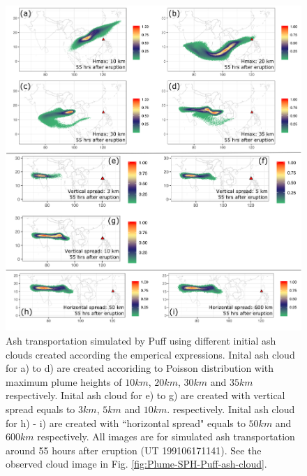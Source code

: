 \documentclass[utf8]{frontiersSCNS} %
\begin{document}
\begin{figure}[!htb]
\centering
\includegraphics[width=0.99 \textwidth]{Figures/discussion}
\caption{Ash transportation simulated by Puff using different initial ash clouds created according the emperical expressions. Inital ash cloud for a) to d)  are created accoriding to Poisson distribution with maximum plume heights of $10km $, $20km$, $30km$ and $35km$ respectively.  Inital ash cloud for e) to g)  are created with vertical spread equals to $3km$, $5km$ and $10km$. respectively.  Inital ash cloud for h) - i)  are created with ``horizontal spread" equals to $50 km$ and $600km$ respectively. All images are for simulated ash transportation around 55 hours after eruption (UT 199106171141). See the observed cloud image in Fig. \ref{fig:Plume-SPH-Puff-ash-cloud}.}
\label{fig:discussion-initial-ash}
\end{figure}
\end{document}
